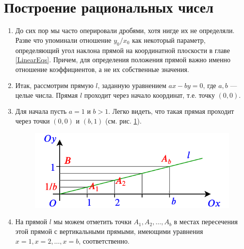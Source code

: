 

\section{Построение рациональных чисел}


\begin{enumerate}
\item До сих пор мы часто оперировали дробями, хотя нигде их не определяли. Разве что упоминали отношение $y_0/x_0$ как некоторый параметр, определяющий угол наклона прямой на координатной плоскости в главе \ref{LinearEqs}. Причем, для определения положения прямой важно именно отношение коэффициентов, а не их собственные значения.
\item Итак, рассмотрим прямую $l$, заданную уравнением $ax-by=0$, где $a,b$ --- целые числа. Прямая $l$ проходит через начало координат, т.е. точку $(0,0)$.
\item Для начала пусть $a=1$ и $b>1$. Легко видеть, что такая прямая проходит через точки $(0,0)$ и $(b,1)$ (см. рис. \ref{section}).
\begin{figure}[hbt!]
\begin{center}
\includegraphics[scale=0.5]{section.png}
\end{center}
\caption{}\label{section}
\end{figure}
\item На прямой $l$ мы можем отметить точки $A_1, A_2, \dots, A_b$ в местах пересечения этой прямой с вертикальными прямыми, имеющими уравнения $x=1, x=2, \dots, x=b$, соответственно.

\end{enumerate}
